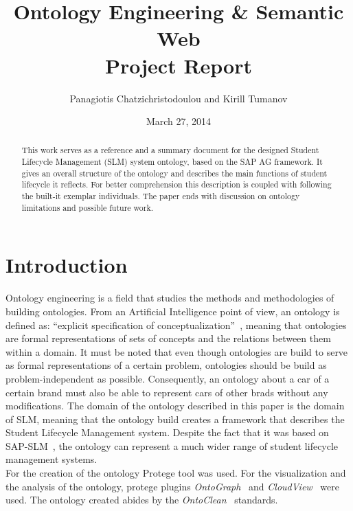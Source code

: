 \documentclass{article}    %
\title{Ontology Engineering \& Semantic Web \\ Project Report}  %
\author{Panagiotis Chatzichristodoulou and Kirill Tumanov}    %
\date{March 27, 2014}   %
\begin{document}
%
\maketitle                 %
%
\begin{abstract}
%
This work serves as a reference and a summary document for the designed Student Lifecycle Management (SLM) system ontology, based on the SAP AG framework. It gives an overall structure of the ontology and describes the main functions of student lifecycle it reflects. For better comprehension this description is coupled with following the built-it exemplar individuals. The paper ends with discussion on ontology limitations and possible future work.
%
\end{abstract}
%
% 
\section{Introduction}
%
Ontology engineering is a field that studies the methods and methodologies of building ontologies. From an Artificial Intelligence point of view, an ontology is defined as: ``explicit specification of conceptualization''~\cite{Gruber}, meaning that ontologies are formal representations of sets of concepts and the relations between them within a domain. It must be noted that even though ontologies are build to serve as formal representations of a certain problem, ontologies should be build as problem-independent as possible. Consequently, an ontology about a car of a certain brand must also be able to represent cars of other brads without any modifications. The domain of the ontology described in this paper is the domain of SLM, meaning that the ontology build creates a framework that describes the Student Lifecycle Management system. Despite the fact that it was based on SAP-SLM~\cite{sap}, the ontology can represent a much wider range of student lifecycle management systems.
\\
For the creation of the ontology Protege tool was used. For the visualization and the analysis of the ontology, protege plugins \textit{OntoGraph}~\cite{protegeOntoGraph} and \textit{CloudView}~\cite{protegeCloudViews} were used. The ontology created abides by the \textit{OntoClean}~\cite{ontoCleanPaper} standards.
% 
\end{document}
